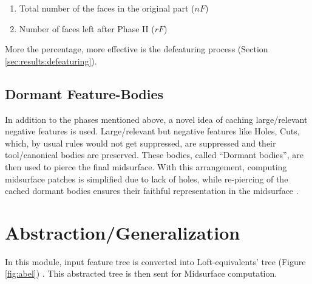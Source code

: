 	\begin{enumerate}
	[noitemsep,topsep=2pt,parsep=2pt,partopsep=2pt]
	\item Total number of the faces in the original part ($nF$)
	\item Number of faces left after Phase II ($rF$)
	\end{enumerate}
		More the percentage, more effective is the defeaturing process (Section \ref{sec:results:defeaturing}). 

\subsection{Dormant Feature-Bodies}\label{sec:dormant}

In addition to the phases mentioned above, a novel idea of caching large/relevant negative features is used.  Large/relevant but negative features like Holes, Cuts, which, by usual rules would not get suppressed, are suppressed and their tool/canonical bodies are preserved. These bodies, called ``Dormant bodies'', are then used to pierce the final midsurface. With this arrangement, computing midsurface patches is simplified due to lack of holes, while re-piercing of the cached dormant bodies ensures their faithful representation in the midsurface .


\section{Abstraction/Generalization}  \label{cagd:sec:abstraction}
In this module, input feature tree is converted into Loft-equivalents' tree (Figure \ref{fig:abel}) \cite{YogeshIITG2014}.   This abstracted tree is then sent for Midsurface computation. 

